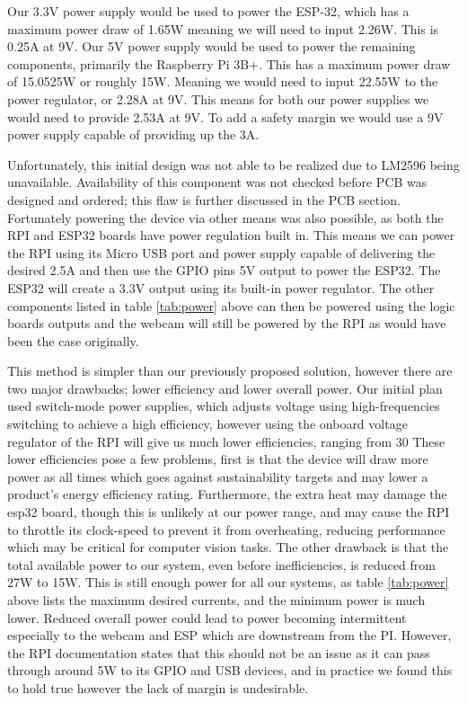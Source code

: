 Our 3.3V power supply would be used to power the ESP-32, which has a maximum power draw of 1.65W meaning we will need to input 2.26W.
This is 0.25A at 9V.
Our 5V power supply would be used to power the remaining components, primarily the Raspberry Pi 3B+.
This has a maximum power draw of 15.0525W or roughly 15W.
Meaning we would need to input 22.55W to the power regulator, or 2.28A at 9V.
This means for both our power supplies we would need to provide 2.53A at 9V.
To add a safety margin we would use a 9V power supply capable of providing up the 3A.

Unfortunately, this initial design was not able to be realized due to LM2596 being unavailable.
Availability of this component was not checked before PCB was designed and ordered; this flaw is further discussed in the PCB section.
Fortunately powering the device via other means was also possible, as both the RPI and ESP32 boards have power regulation built in.
This means we can power the RPI using its Micro USB port and power supply capable of delivering the desired 2.5A and then use the GPIO pins 5V output to power the ESP32.
The ESP32 will create a 3.3V output using its built-in power regulator.
The other components listed in table \ref{tab:power} above can then be powered using the logic boards outputs and the webcam will still be powered by the RPI as would have been the case originally.

This method is simpler than our previously proposed solution, however there are two major drawbacks; lower efficiency and lower overall power.
Our initial plan used switch-mode power supplies, which adjusts voltage using high-frequencies switching to achieve a high efficiency, however using the onboard voltage regulator of the RPI will give us much lower efficiencies, ranging from 30%
These lower efficiencies pose a few problems, first is that the device will draw more power as all times which goes against sustainability targets and may lower a product's energy efficiency rating.
Furthermore, the extra heat may damage the esp32 board, though this is unlikely at our power range, and may cause the RPI to throttle its clock-speed to prevent it from overheating, reducing performance which may be critical for computer vision tasks.
The other drawback is that the total available power to our system, even before inefficiencies, is reduced from 27W to 15W.
This is still enough power for all our systems, as table \ref{tab:power} above lists the maximum desired currents, and the minimum power is much lower.
Reduced overall power could lead to power becoming intermittent especially to the webcam and ESP which are downstream from the PI.
However, the RPI documentation states that this should not be an issue as it can pass through around 5W to its GPIO and USB devices, and in practice we found this to hold true however the lack of margin is undesirable.

